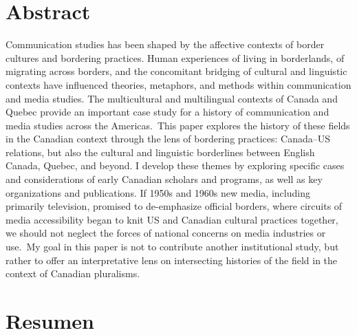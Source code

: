 \documentclass{tufte-handout}
\begin{document}
\begin{titlepage}
\begin{fullwidth}
\end{fullwidth}

\vspace*{1em}


\hypertarget{abstract}{%
\section{Abstract}\label{abstract}}

Communication studies has been shaped by the affective contexts of
border cultures and bordering practices. Human experiences of living in
borderlands, of migrating across borders, and the concomitant bridging
of cultural and linguistic contexts have influenced theories, metaphors,
and methods within communication and media studies. The multicultural
and multilingual contexts of Canada and Quebec provide an important case
study for a history of communication and media studies across the
Americas.~This paper explores the history of these fields in the
Canadian context through the lens of bordering practices: Canada--US
relations, but also the cultural and linguistic borderlines between
English Canada, Quebec, and beyond. I develop these themes by exploring
specific cases and considerations of early Canadian scholars and
programs, as well as key organizations and publications. If 1950s and
1960s new media, including primarily television, promised to
de-emphasize official borders, where circuits of media accessibility
began to knit US and Canadian cultural practices together, we should not
neglect the forces of national concerns on media industries or use.~My
goal in this paper is not to contribute another institutional study, but
rather to offer an interpretative lens on intersecting histories of the
field in the context of Canadian pluralisms.

\enlargethispage{2\baselineskip}

\vspace*{4em}


\hypertarget{resumen}{%
\section{Resumen}\label{resumen}}


\end{titlepage}
\end{document}
